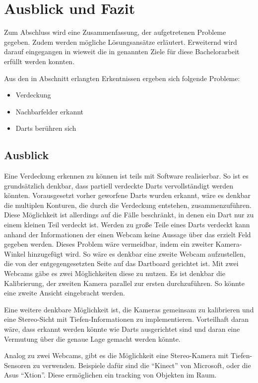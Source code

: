 \chapter{Ausblick und Fazit}
\label{chap:prospect}
Zum Abschluss wird eine Zusammenfassung, der aufgetretenen Probleme gegeben. Zudem werden mögliche Lösungsansätze erläutert. Erweiternd wird darauf eingegangen in wieweit die in  genannten Ziele für diese Bachelorarbeit erfüllt werden konnten.

Aus den in Abschnitt  erlangten Erkentnissen ergeben sich folgende Probleme:
\begin{itemize}
	\item Verdeckung
	\item Nachbarfelder erkannt
	\item Darts berühren sich
\end{itemize}

\section*{Ausblick}
Eine Verdeckung erkennen zu können ist teils mit Software realisierbar. So ist es grundsätzlich denkbar, dass partiell verdeckte Darts vervollständigt werden könnten. Vorausgesetzt vorher geworfene Darts wurden erkannt, wäre es denkbar die multiplen Konturen, die durch die Verdeckung entstehen, zusammenzuführen. Diese Möglichkeit ist allerdings auf die Fälle beschränkt, in denen ein Dart nur zu einem kleinen Teil verdeckt ist. Werden zu große Teile eines Darts verdeckt kann anhand der Informationen der einen Webcam keine Aussage über das erzielt Feld gegeben werden. 
Dieses Problem wäre vermeidbar, indem ein zweiter Kamera-Winkel hinzugefügt wird. 
So wäre es denkbar eine zweite Webcam aufzustellen, die von der entgegengesetzten Seite auf das Dartboard gerichtet ist. Mit zwei Webcams gäbe es zwei Möglichkeiten diese zu nutzen. 
Es ist denkbar die Kalibrierung, der zweiten Kamera parallel zur ersten durchzuführen. So könnte eine zweite Ansicht eingebracht werden. 

Eine weitere denkbare Möglichkeit ist, die Kameras gemeinsam zu kalibrieren und eine Stereo-Sicht mit Tiefen-Informationen zu implementieren. Vorteilhaft daran wäre, dass erkannt werden könnte wie Darts ausgerichtet sind und daran eine Vermutung über die genaue Lage gemacht werden könnte. 

Analog zu zwei Webcams, gibt es die Möglichkeit eine Stereo-Kamera mit Tiefen-Sensoren zu verwenden. Beispiele dafür sind die "`Kinect"' von Microsoft, oder die Asus "`Xtion"'. Diese ermöglichen ein tracking von Objekten im Raum.

